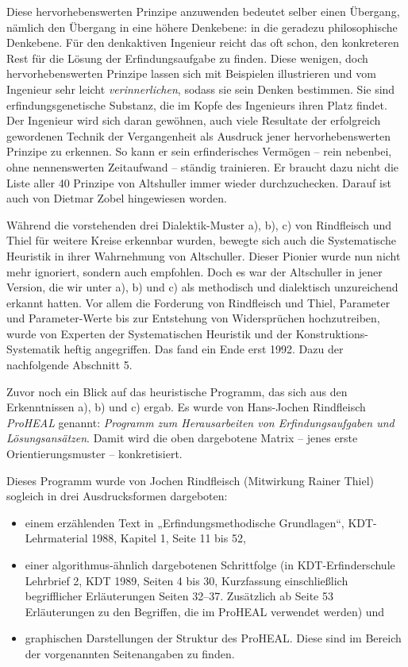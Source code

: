 \documentclass[11pt,a4paper]{article}
\begin{document}
Diese hervorhebenswerten Prinzipe anzuwenden bedeutet selber einen Übergang,
nämlich den Übergang in eine höhere Denkebene: in die geradezu philosophische
Denkebene. Für den denkaktiven Ingenieur reicht das oft schon, den konkreteren
Rest für die Lösung der Erfindungsaufgabe zu finden.  Diese wenigen, doch
hervorhebenswerten Prinzipe lassen sich mit Beispielen illustrieren und vom
Ingenieur sehr leicht \emph{verinnerlichen}, sodass sie sein Denken bestimmen.
Sie sind erfindungsgenetische Substanz, die im Kopfe des Ingenieurs ihren Platz
findet. Der Ingenieur wird sich daran gewöhnen, auch viele Resultate der
erfolgreich gewordenen Technik der Vergangenheit als Ausdruck jener
hervorhebenswerten Prinzipe zu erkennen. So kann er sein erfinderisches
Vermögen – rein nebenbei, ohne nennenswerten Zeitaufwand – ständig
trainieren. Er braucht dazu nicht die Liste aller 40 Prinzipe von Altshuller
immer wieder durchzuchecken. Darauf ist auch von Dietmar Zobel hingewiesen
worden.

Während die vorstehenden drei Dialektik-Muster a), b), c) von Rindfleisch und
Thiel für weitere Kreise erkennbar wurden, bewegte sich auch die Systematische
Heuristik in ihrer Wahrnehmung von Altschuller. Dieser Pionier wurde nun nicht
mehr ignoriert, sondern auch empfohlen. Doch es war der Altschuller in jener
Version, die wir unter a), b) und c) als methodisch und dialektisch
unzureichend erkannt hatten. Vor allem die Forderung von Rindfleisch und Thiel,
Parameter und Parameter-Werte bis zur Entstehung von Widersprüchen
hochzutreiben, wurde von Experten der Systematischen Heuristik und der
Konstruktions-Systematik heftig angegriffen. Das fand ein Ende erst 1992. Dazu
der nachfolgende Abschnitt 5.

Zuvor noch ein Blick auf das heuristische Programm, das sich aus den
Erkenntnissen a), b) und c) ergab. Es wurde von Hans-Jochen Rindfleisch
\emph{ProHEAL} genannt: \emph{Programm zum Herausarbeiten von
  Erfindungsaufgaben und Lösungsansätzen}. Damit wird die oben dargebotene
Matrix – jenes erste Orientierungsmuster – konkretisiert.

Dieses Programm wurde von Jochen Rindfleisch (Mitwirkung Rainer Thiel) sogleich
in drei Ausdrucksformen dargeboten:
\begin{itemize}\itemsep0pt
\item einem erzählenden Text in „Erfindungsmethodische Grundlagen“,
  KDT-Lehrmaterial 1988, Kapitel 1, Seite 11 bis 52,
\item einer algorithmus-ähnlich dargebotenen Schrittfolge (in
  KDT-Erfinderschule Lehrbrief 2, KDT 1989, Seiten 4 bis 30, Kurzfassung
  einschließlich begrifflicher Erläuterungen Seiten 32–37. Zusätzlich ab Seite
  53 Erläuterungen zu den Begriffen, die im ProHEAL verwendet werden) und
\item graphischen Darstellungen der Struktur des ProHEAL. Diese sind im Bereich
  der vorgenannten Seitenangaben zu finden.
\end{itemize}
\end{document}
